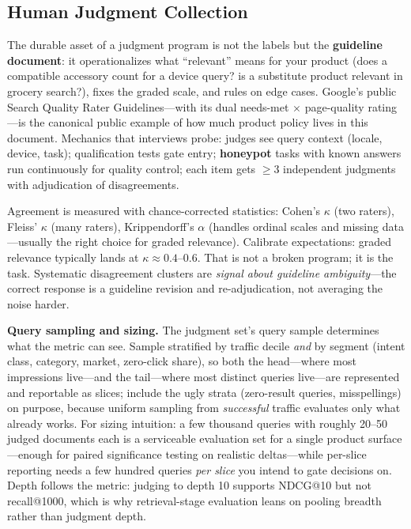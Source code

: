 \subsection{Human Judgment Collection}

The durable asset of a judgment program is not the labels but the \textbf{guideline document}: it operationalizes what ``relevant'' means for your product (does a compatible accessory count for a device query? is a substitute product relevant in grocery search?), fixes the graded scale, and rules on edge cases. Google's public Search Quality Rater Guidelines---with its dual needs-met $\times$ page-quality rating---is the canonical public example of how much product policy lives in this document. Mechanics that interviews probe: judges see query context (locale, device, task); qualification tests gate entry; \textbf{honeypot} tasks with known answers run continuously for quality control; each item gets $\geq 3$ independent judgments with adjudication of disagreements.

Agreement is measured with chance-corrected statistics: Cohen's $\kappa$ (two raters), Fleiss' $\kappa$ (many raters), Krippendorff's $\alpha$ (handles ordinal scales and missing data---usually the right choice for graded relevance). Calibrate expectations: graded relevance typically lands at $\kappa \approx 0.4$--$0.6$. That is not a broken program; it is the task. Systematic disagreement clusters are \textit{signal about guideline ambiguity}---the correct response is a guideline revision and re-adjudication, not averaging the noise harder.

\textbf{Query sampling and sizing.} The judgment set's query sample determines what the metric can see. Sample stratified by traffic decile \textit{and} by segment (intent class, category, market, zero-click share), so both the head---where most impressions live---and the tail---where most distinct queries live---are represented and reportable as slices; include the ugly strata (zero-result queries, misspellings) on purpose, because uniform sampling from \textit{successful} traffic evaluates only what already works. For sizing intuition: a few thousand queries with roughly 20--50 judged documents each is a serviceable evaluation set for a single product surface---enough for paired significance testing on realistic deltas---while per-slice reporting needs a few hundred queries \textit{per slice} you intend to gate decisions on. Depth follows the metric: judging to depth 10 supports NDCG@10 but not recall@1000, which is why retrieval-stage evaluation leans on pooling breadth rather than judgment depth.

